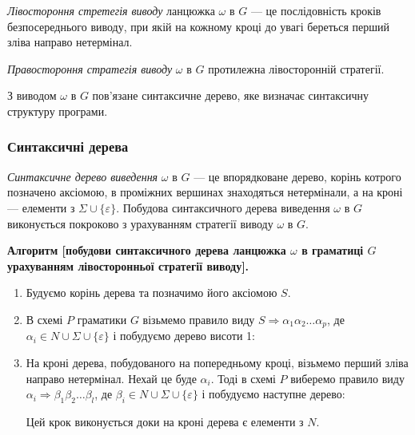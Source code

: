 \textit{Лівостороння стретегія виводу} ланцюжка $\omega$ в $G$ --- це послідовність кроків безпосереднього виводу, при якій на кожному кроці до увагі береться перший зліва направо нетермінал. \medskip

\textit{Правостороння стратегія виводу} $\omega$ в $G$ протилежна лівосторонній стратегії. \medskip

З виводом $\omega$ в $G$ пов'язане синтаксичне дерево, яке визначає синтаксичну структуру програми.

\subsubsection{Синтаксичні дерева}

\textit{Синтаксичне дерево виведення} $\omega$ в $G$ --- це впорядковане дерево, корінь котрого позначено аксіомою, в проміжних вершинах знаходяться нетермінали, а на кроні --- елементи з $\Sigma \cup \{\varepsilon\}$. Побудова синтаксичного дерева виведення $\omega$ в $G$ виконується покроково з урахуванням стратегії виводу $\omega$ в $G$. \medskip


\textbf{Алгоритм [побудови синтаксичного дерева ланцюжка $\omega$ в граматиці $G$ урахуванням лівосторонньої стратегії виводу].}
\begin{enumerate}
	\item Будуємо корінь дерева та позначимо його аксіомою $S$.

	\item В схемі $P$ граматики $G$ візьмемо правило виду $S \Rightarrow \alpha_1 \alpha_2 \ldots \alpha_p$, де $\alpha_i \in N \cup \Sigma \cup \{\varepsilon\} $	і побудуємо дерево висоти 1: 
	\begin{figure}[H]
		\centering
		
	\end{figure}

	\item На кроні дерева, побудованого на попередньому кроці, візьмемо перший зліва направо нетермінал. Нехай це буде $\alpha_i$. Тоді в схемі $P$ виберемо правило виду $\alpha_i \Rightarrow \beta_1 \beta_2 \ldots \beta_l$, де $\beta_i \in N \cup \Sigma \cup \{\varepsilon\}$ і побудуємо наступне дерево: 
	\begin{figure}[H]
		\centering
		
	\end{figure}

	Цей крок виконується доки на кроні дерева є елементи з $N$.
\end{enumerate}

